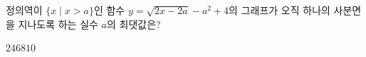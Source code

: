\hspace*{2mm}\begin{minipage}[t]{\dimexpr\linewidth-2mm\relax}\vspace{0pt}
정의역이 $\{x \mid x>a\}$인 함수 $y=\sqrt{2x-2a}-a^2+4$의 그래프가 오직 하나의 사분면을 지나도록 하는 실수 $a$의 최댓값은?
\begin{choices32}{$2$}{$4$}{$6$}{$8$}{$10$}\end{choices32}\end{minipage}
